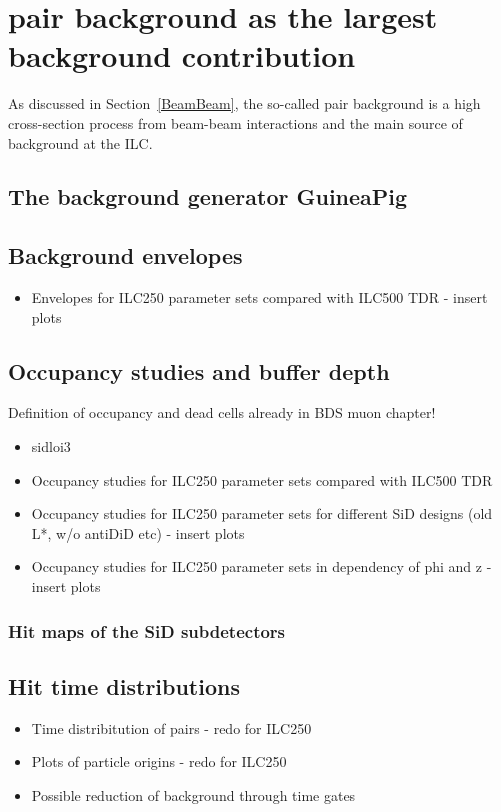 \chapter{\positron\electron pair background as the largest background contribution}
\label{PairBkg}
As discussed in Section~\ref{BeamBeam}, the so-called pair background is a high cross-section process from beam-beam interactions and the main source of background at the ILC.


\section{The background generator GuineaPig}
\label{PairBkg:GuineaPig}

\section{Background envelopes}
\label{PairBkg:helix}
\begin{itemize}
 \item Envelopes for ILC250 parameter sets compared with ILC500 TDR - insert plots
\end{itemize}

\section{Occupancy studies and buffer depth}
\label{PairBkg:occupancy}
Definition of occupancy and dead cells already in BDS muon chapter!
\begin{itemize}
 \item sidloi3
 \item Occupancy studies for ILC250 parameter sets compared with ILC500 TDR
 \item Occupancy studies for ILC250 parameter sets for different SiD designs (old L*, w/o antiDiD etc) - insert plots
 \item Occupancy studies for ILC250 parameter sets in dependency of phi and z - insert plots
\end{itemize}

\subsection{Hit maps of the SiD subdetectors}
\label{PairBkg:hitmaps}


\section{Hit time distributions}
\label{PairBkg:hittime}

\begin{itemize}
 \item Time distribitution of pairs - redo for ILC250
 \item Plots of particle origins - redo for ILC250
 \item Possible reduction of background through time gates
\end{itemize}


